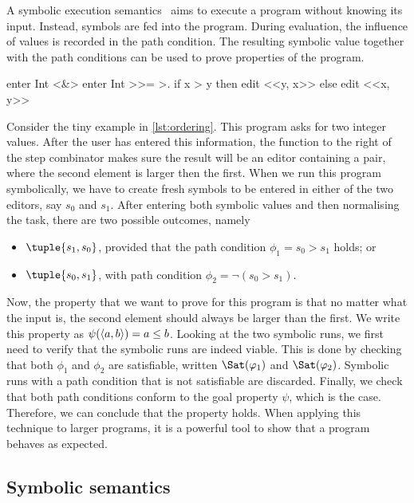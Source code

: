A symbolic execution semantics~\cite{King1975,Boyer1975} aims to execute a program without knowing its input.
Instead, symbols are fed into the program.
During evaluation, the influence of values is recorded in the path condition.
The resulting symbolic value together with the path conditions can be used to prove properties of the program.

\begin{TASK}[
    float=ht,
    caption={Ordering of tuple elements.},
    captionpos=b,
    label=lst:ordering]
  enter Int <&> enter Int >>= >. if x > y then edit <<y, x>> else edit <<x, y>>
\end{TASK}

Consider the tiny example in \cref{lst:ordering}.
This program asks for two integer values.
After the user has entered this information, the function to the right of the step combinator makes sure the result will be an editor containing a pair,
where the second element is larger then the first.
When we run this program symbolically, we have to create fresh symbols to be entered in either of the two editors, say $s_0$ and $s_1$.
After entering both symbolic values and then normalising the task, there are two possible outcomes, namely
\begin{itemize}
  \item $\tuple{s_1,s_0}$, provided that the path condition $\phi_1 = s_0 > s_1$ holds; or
  \item $\tuple{s_0,s_1}$, with path condition $\phi_2 = \lnot (s_0 > s_1)$.
\end{itemize}

Now, the property that we want to prove for this program is that no matter what the input is, the second element should always be larger than the first.
We write this property as $\psi(\langle a, b\rangle)= a \leq b$.
Looking at the two symbolic runs, we first need to verify that the symbolic runs are indeed viable.
This is done by checking that both $\phi_1$ and $\phi_2$ are satisfiable, written $\Sat(\phi_1)$ and $\Sat(\phi_2)$.
Symbolic runs with a path condition that is not satisfiable are discarded.
Finally, we check that both path conditions conform to the goal property $\psi$, which is the case.
Therefore, we can conclude that the property holds.
When applying this technique to larger programs, it is a powerful tool to show that a program behaves as expected.


\subsection{Symbolic semantics}
\label{sub:symbolic-semantics}

